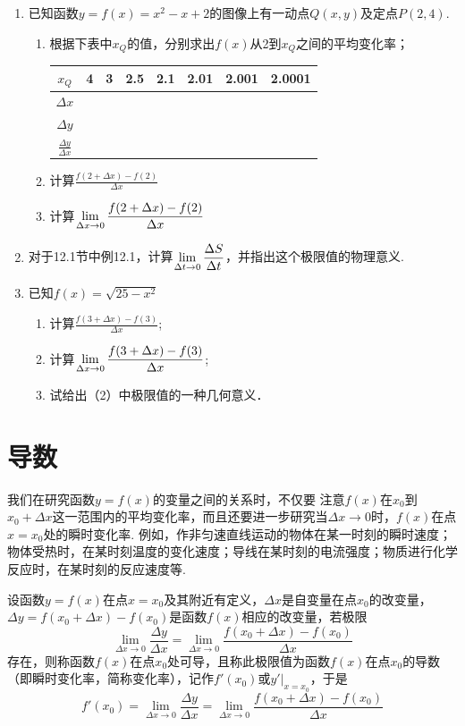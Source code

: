 \begin{ex}
\begin{enumerate}
    \item 已知函数$y=f(x)=x^2-x+2$的图像上有一动点$Q(x,y)$及定点$P(2,4)$.
\begin{enumerate}[(1)]
    \item 根据下表中$x_Q$的值，分别求出$f(x)$从2到$x_Q$之间的平均变化率；
\begin{center}
\begin{tabular}{c|ccccccc}
\hline
$x_Q$ & 4&3&2.5&2.1& 2.01& 2.001& 2.0001\\
\hline
$\Delta x$ \\
$\Delta y$ \\ [1.5ex]
$\frac{\Delta y}{\Delta x}$\\
\hline
\end{tabular}
\end{center}
\item 计算$\frac{f(2+\Delta x)-f(2)}{\Delta x}$
\item 计算$\lim\limits_{\Delta x\to 0}\dfrac{f(2+\Delta x)-f(2)}{\Delta x}$
\end{enumerate}

\item 对于12.1节中例12.1，计算$\lim\limits_{\Delta t\to 0}\dfrac{\Delta S}{\Delta t}$，并指出这个极限值的物理意义.
\item 已知$f(x)=\sqrt{25-x^2}$
\begin{enumerate}[(1)]
\item 计算$\frac{f(3+\Delta x)-f(3)}{\Delta x}$;
\item 计算$\lim\limits_{\Delta x\to 0}\dfrac{f(3+\Delta x)-f(3)}{\Delta x}$;
\item 试给出（2）中极限值的一种几何意义．
\end{enumerate}
\end{enumerate}
\end{ex}

\section{导数}
我们在研究函数$y=f(x)$的变量之间的关系时，不仅要
注意$f(x)$在$x_0$到$x_0+\Delta x$这一范围内的平均变化率，而且还要进一步研究当$\Delta x\to 0$时，$f(x)$在点$x=x_0$处的瞬时变化率. 例如，作非匀速直线运动的物体在某一时刻的瞬时速度；物体受热时，在某时刻温度的变化速度；导线在某时刻的电流强度；物质进行化学反应时，在某时刻的反应速度等.

设函数$y=f(x)$在点$x=x_0$及其附近有定义，$\Delta x$是自变量在点$x_0$的改变量，$\Delta y=f(x_0+\Delta x)-f(x_0)$是函数$f(x)$相应的改变量，若极限
\[\lim_{\Delta x\to 0}\frac{\Delta y}{\Delta x}=\lim_{\Delta x\to 0}\frac{f(x_0+\Delta x)-f(x_0)}{\Delta x}\]
存在，则称函数$f(x)$在点$x_0$处可导，且称此极限值为函数$f(x)$在点$x_0$的导数（即瞬时变化率，简称变化率），记作$f'(x_0)$或$y'\Big|_{x=x_0}$，于是
\[f'(x_0)=\lim_{\Delta x\to 0}\frac{\Delta y}{\Delta x}=\lim_{\Delta x\to 0}\frac{f(x_0+\Delta x)-f(x_0)}{\Delta x}\]

